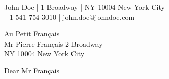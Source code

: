 \documentclass[]{coverletter}
\begin{document}
	\begin{sender}
		John Doe | 1 Broadway | NY 10004 New York City\\
		+1-541-754-3010 | john.doe@johndoe.com
	\end{sender}

	\begin{addressee}
		Au Petit Français\\
		Mr Pierre Français
		2 Broadway\\
		NY 10004 New York City\\
	\end{addressee}

	\printdate
	
	\printtitle
	
	Dear Mr Français
	
	\Blindtext[4]
	
	\printsignature
	
	

	
\end{document}
